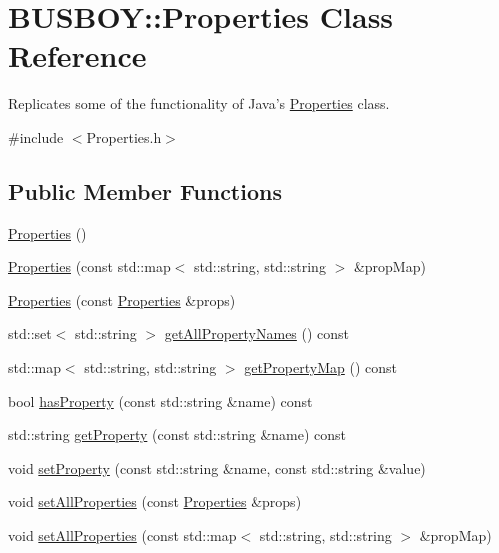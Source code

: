 \hypertarget{classBUSBOY_1_1Properties}{
\section{BUSBOY::Properties Class Reference}
\label{classBUSBOY_1_1Properties}
}


Replicates some of the functionality of Java's \hyperlink{classBUSBOY_1_1Properties}{Properties} class.  


{\ttfamily \#include $<$Properties.h$>$}\subsection*{Public Member Functions}
\begin{DoxyCompactItemize}
\item 
\hyperlink{classBUSBOY_1_1Properties_a4b844e15332fb8a8089aa1d217ce791d}{Properties} ()
\item 
\hyperlink{classBUSBOY_1_1Properties_ab6d9fc1bbffa23b1b4e468b322102d24}{Properties} (const std::map$<$ std::string, std::string $>$ \&propMap)
\item 
\hyperlink{classBUSBOY_1_1Properties_a2d5de87f615fed59f1bbcb8e738a22bb}{Properties} (const \hyperlink{classBUSBOY_1_1Properties}{Properties} \&props)
\item 
std::set$<$ std::string $>$ \hyperlink{classBUSBOY_1_1Properties_aec9ae610f9a2cdc964c70d30bf05f95b}{getAllPropertyNames} () const 
\item 
std::map$<$ std::string, std::string $>$ \hyperlink{classBUSBOY_1_1Properties_a496e96e1883d04b29f4889c49f0446d9}{getPropertyMap} () const 
\item 
bool \hyperlink{classBUSBOY_1_1Properties_a35e39730dcea4b741108903a5aa9e0da}{hasProperty} (const std::string \&name) const 
\item 
std::string \hyperlink{classBUSBOY_1_1Properties_a7ab0d31f9dd2d5a4aa56f4bf4e1a49f8}{getProperty} (const std::string \&name) const 
\item 
void \hyperlink{classBUSBOY_1_1Properties_ab40fa24bd8b35d291e11353f5a442868}{setProperty} (const std::string \&name, const std::string \&value)
\item 
void \hyperlink{classBUSBOY_1_1Properties_a073d551f053cd93ab5087cfa41e07b84}{setAllProperties} (const \hyperlink{classBUSBOY_1_1Properties}{Properties} \&props)
\item 
void \hyperlink{classBUSBOY_1_1Properties_a5648c05d0e377b42f087b899e64e5aff}{setAllProperties} (const std::map$<$ std::string, std::string $>$ \&propMap)

\end{DoxyCompactItemize}
